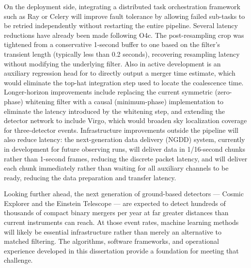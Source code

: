 On the deployment side, integrating a distributed task orchestration framework such as Ray or Celery will improve fault tolerance by allowing failed sub-tasks to be retried independently without restarting the entire pipeline.
Several latency reductions have already been made following O4c.
The post-resampling crop was tightened from a conservative 1-second buffer to one based on the filter's transient length (typically less than 0.2 seconds), recovering resampling latency without modifying the underlying filter.
Also in active development is an auxiliary regression head for \aframe to directly output a merger time estimate, which would eliminate the top-hat integration step used to locate the coalescence time.
Longer-horizon improvements include replacing the current symmetric (zero-phase) whitening filter with a causal (minimum-phase) implementation to eliminate the latency introduced by the whitening step, and extending the detector network to include Virgo, which would broaden sky localization coverage for three-detector events.
Infrastructure improvements outside the pipeline will also reduce latency: the next-generation data delivery (NGDD) system, currently in development for future observing runs, will deliver data in 1/16-second chunks rather than 1-second frames, reducing the discrete packet latency, and will deliver each chunk immediately rather than waiting for all auxiliary channels to be ready, reducing the data preparation and transfer latency.

Looking further ahead, the next generation of ground-based detectors --- Cosmic Explorer and the Einstein Telescope --- are expected to detect hundreds of thousands of compact binary mergers per year at far greater distances than current instruments can reach.
At those event rates, machine learning methods will likely be essential infrastructure rather than merely an alternative to matched filtering.
The algorithms, software frameworks, and operational experience developed in this dissertation provide a foundation for meeting that challenge.

